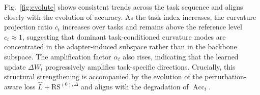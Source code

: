 \documentclass[10pt]{article} %
\begin{document}


Fig.~\ref{fig:evolute} shows consistent trends across the task sequence and aligns closely with the evolution of accuracy.
As the task index increases, the curvature projection ratio $c_t$ increases over tasks and remains above the reference level $c_t\approx 1$, suggesting that dominant task-conditioned curvature modes are concentrated in the adapter-induced subspace rather than in the backbone subspace.
The amplification factor $\alpha_t$ also rises, indicating that the learned update $\Delta W_t$ progressively amplifies task-specific directions.
Crucially, this structural strengthening is accompanied by the evolution of the perturbation-aware loss $\hat L+\mathrm{RS}^{(0),\Delta}$ and aligns with the degradation of $\operatorname{Acc}_t$.
\end{document}
